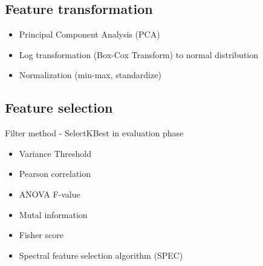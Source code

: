 \subsection{Feature transformation}
\cite{zheng_feature_2018}
\begin{itemize}
\item Principal Component Analysis (PCA)
\item Log transformation (Box-Cox Transform) to normal distribution
\item Normalization (min-max, standardize) 
\end{itemize}

\subsection{Feature selection}
\cite{nandi_condition_2019}
Filter method - SelectKBest  in evaluation phase
\begin{itemize}
\item Variance Threshold
\item Pearson correlation
\item ANOVA F-value
\item Mutal information
\item Fisher score
\item Spectral feature selection algorithm (SPEC)
\end{itemize} 
